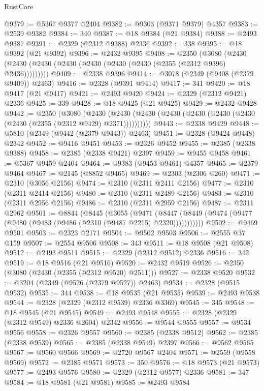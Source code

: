 \begin{lexlean}{RustCore}
\begin{coremodule}
@9379 := @5367 @9377 @2404
@9382 := @9303 (@9371 @9379) @4357
@9383 := @2539 @9382
@9384 := 340
@9387 := @18 @9384 (@21 @9384)
@9388 := @2493 @9387
@9391 := @2329 (@2312 @9388) @2336
@9392 := 338
@9395 := @18 @9392 (@21 @9392)
@9396 := @2432 @9395
@9408 := @2350
    (@3080 (@2430 (@2430 (@2430 (@2430 (@2430 (@2430 (@2430 (@2355 (@2312 @9396) @2436)))))))))
@9409 := @2338 @9396
@9414 := @3078 (@2349 (@9408 (@2379 @9409)) @2463)
@9416 := @2328 (@9391 @9414)
@9417 := 341
@9420 := @18 @9417 (@21 @9417)
@9421 := @2493 @9420
@9424 := @2329 (@2312 @9421) @2336
@9425 := 339
@9428 := @18 @9425 (@21 @9425)
@9429 := @2432 @9428
@9442 := @2350
    (@3080
      (@2430 (@2430 (@2430 (@2430 (@2430 (@2430 (@2430 (@2430 (@2355 (@2312 @9429) @2371))))))))))
@9443 := @2338 @9429
@9448 := @5810 (@2349 (@9442 (@2379 @9443)) @2463)
@9451 := @2328 (@9424 @9448) @2342
@9452 := @9416 @9451
@9453 := @2326 @9452
@9455 := @2385 (@2338 @9388)
@9458 := @2385 (@2338 @9421) @2397
@9459 := @9455 @9458
@9461 := @5367 @9459 @2404
@9464 := @9383 (@9453 @9461) @4357
@9465 := @2379 @9464
@9467 := @2145 (@8852 @9465)
@9469 := @2303 (@2306 @260)
@9471 := @2310 (@3056 @2156)
@9474 := @2310 (@2311 @2411 @2156)
@9477 := @2310 (@2311 @2414 @2156)
@9480 := @2310 (@2311 @2489 @2156)
@9483 := @2310 (@2311 @2956 @2156)
@9486 := @2310 (@2311 @2959 @2156)
@9487 := @2311 @2962
@9501 := @8844
    (@8445
      (@3055
        (@9471
          (@8447 (@8449 (@9474 (@9477 (@9480 (@9483 (@9486 (@2310 (@9487 @2215) @2320)))))))))))
@9502 := @9469 @9501
@9503 := @2323 @2171
@9504 := @9502 @9503
@9506 := @2555 @37 @159
@9507 := @2554 @9506
@9508 := 343
@9511 := @18 @9508 (@21 @9508)
@9512 := @2493 @9511
@9515 := @2329 (@2312 @9512) @2336
@9516 := 342
@9519 := @18 @9516 (@21 @9516)
@9520 := @2432 @9519
@9526 := @2350 (@3080 (@2430 (@2355 (@2312 @9520) @2511)))
@9527 := @2338 @9520
@9532 := @3204 (@2349 (@9526 (@2379 @9527)) @2463)
@9534 := @2328 (@9515 @9532)
@9535 := 344
@9538 := @18 @9535 (@21 @9535)
@9539 := @2493 @9538
@9544 := @2328 (@2329 (@2312 @9539) @2336 @3369)
@9545 := 345
@9548 := @18 @9545 (@21 @9545)
@9549 := @2493 @9548
@9555 := @2328 (@2329 (@2312 @9549) @2336 @2604) @2342
@9556 := @9544 @9555
@9557 := @9534 @9556
@9558 := @2326 @9557
@9560 := @2385 (@2338 @9512)
@9562 := @2385 (@2338 @9539)
@9565 := @2385 (@2338 @9549) @2397
@9566 := @9562 @9565
@9567 := @9560 @9566
@9569 := @2720 @9567 @2404
@9571 := @2559 (@9558 @9569)
@9572 := @2385 @9571
@9573 := 350
@9576 := @18 @9573 (@21 @9573)
@9577 := @2493 @9576
@9580 := @2329 (@2312 @9577) @2336
@9581 := 347
@9584 := @18 @9581 (@21 @9581)
@9585 := @2493 @9584

\end{coremodule}
\end{lexlean}
